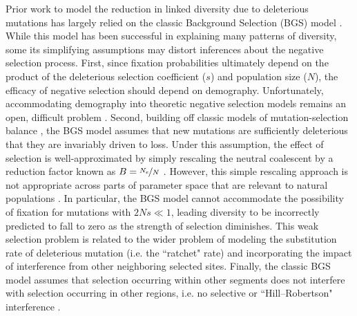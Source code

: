 \documentclass[11pt]{article}
\begin{document}
Prior work to model the reduction in linked diversity due to deleterious
mutations has largely relied on the classic Background Selection (BGS) model
\parencite{Charlesworth1993-gb,Nordborg1996-nq,Hudson1995-pt,Hudson1995-xc}.
While this model has been successful in explaining many patterns of diversity,
some its simplifying assumptions may distort inferences about the negative
selection process. First, since fixation probabilities ultimately depend on the
product of the deleterious selection coefficient ($s$) and population size
($N$), the efficacy of negative selection should depend on demography.
Unfortunately, accommodating demography into theoretic negative selection
models remains an open, difficult problem \parencite{Zeng2013-ep,Johri2020-oj}.
Second, building off classic models of mutation-selection balance
\parencite{Crow1970-wm,Kimura1966-bk}, the BGS model assumes that new mutations
are sufficiently deleterious that they are invariably driven to loss. Under
this assumption, the effect of selection is well-approximated by simply
rescaling the neutral coalescent by a reduction factor known as $B =
\nicefrac{N_e}{N}$ \parencite{Charlesworth2013-kl}. However, this simple
rescaling approach is not appropriate across parts of parameter space that are
relevant to natural populations \parencite{McVean2000-bt,Good2014-yz}. In
particular, the BGS model cannot accommodate the possibility of fixation for
mutations with $2Ns \ll 1$, leading diversity to be incorrectly predicted to
fall to zero as the strength of selection diminishes. This weak selection
problem is related to the wider problem of modeling the substitution rate of
deleterious mutation (i.e. the ``ratchet" rate) and incorporating the impact of
interference from other neighboring selected sites. Finally, the classic BGS
model assumes that selection occurring within other segments does not interfere
with selection occurring in other regions, i.e. no selective or
``Hill--Robertson" interference
\parencite{Hill1966-kd,McVean2000-bt,Felsenstein1974-xm}.
\end{document}
